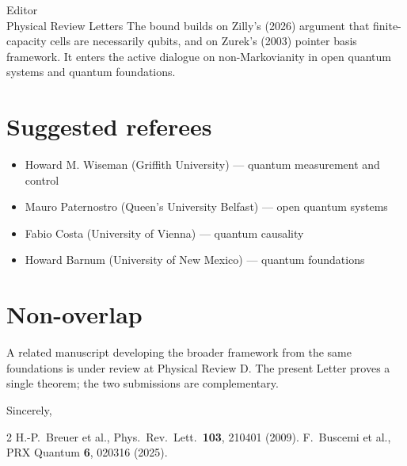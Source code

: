 \documentclass[12pt]{letter}
\begin{document}
\begin{letter}{Editor\\Physical Review Letters}
The bound builds on Zilly's (2026) argument that finite-capacity cells are necessarily qubits, and on Zurek's (2003) pointer basis framework. It enters the active dialogue on non-Markovianity in open quantum systems and quantum foundations.

\section*{Suggested referees}

\begin{itemize}
    \item Howard M. Wiseman (Griffith University) --- quantum measurement and control
    \item Mauro Paternostro (Queen's University Belfast) --- open quantum systems
    \item Fabio Costa (University of Vienna) --- quantum causality
    \item Howard Barnum (University of New Mexico) --- quantum foundations
\end{itemize}

\section*{Non-overlap}

A related manuscript developing the broader framework from the same foundations is under review at Physical Review D. The present Letter proves a single theorem; the two submissions are complementary.

\closing{Sincerely,}

\begin{thebibliography}{2}
 H.-P.~Breuer et al., Phys.\ Rev.\ Lett.\ \textbf{103}, 210401 (2009).
 F.~Buscemi et al., PRX Quantum \textbf{6}, 020316 (2025).
\end{thebibliography}

\end{letter}
\end{document}
